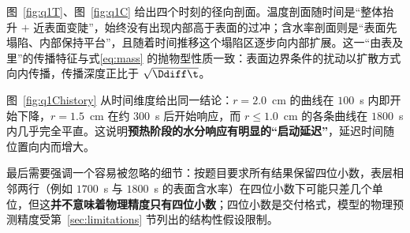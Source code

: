 
图~\ref{fig:q1T}、图~\ref{fig:q1C} 给出四个时刻的径向剖面。温度剖面随时间是``整体抬升 $+$ 近表面变陡''，始终没有出现内部高于表面的过冲；含水率剖面则是``表面先塌陷、内部保持平台''，且随着时间推移这个塌陷区逐步向内部扩展。这一``由表及里''的传播特征与式\eqref{eq:mass} 的抛物型性质一致：表面边界条件的扰动以扩散方式向内传播，传播深度正比于 $\sqrt{\Ddiff\t}$。


图~\ref{fig:q1Chistory} 从时间维度给出同一结论：$r=2.0$~cm 的曲线在 $100$~s 内即开始下降，$r=1.5$~cm 在约 $300$~s 后开始响应，而 $r\le1.0$~cm 的各条曲线在 $1800$~s 内几乎完全平直。这说明\textbf{预热阶段的水分响应有明显的``启动延迟''}，延迟时间随位置向内而增大。

最后需要强调一个容易被忽略的细节：按题目要求所有结果保留四位小数，表层相邻两行（例如 $1700$~s 与 $1800$~s 的表面含水率）在四位小数下可能只差几个单位，但这\textbf{并不意味着物理精度只有四位小数}；四位小数是交付格式，模型的物理预测精度受第~\ref{sec:limitations} 节列出的结构性假设限制。
